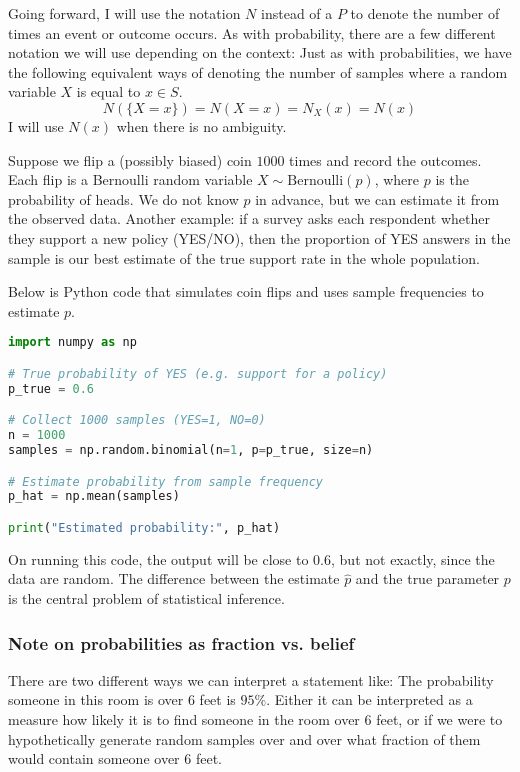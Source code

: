 Going forward, I will use the notation $N$ instead of a $P$ to denote the number of times an event or outcome occurs. As with probability, there are a few different notation we will use depending on the context: Just as with probabilities, we have the following equivalent ways of denoting the number of samples where a random variable $X$ is equal to $x \in S$. 
\begin{equation}
N(\{X= x\}) =N(X=x) = N_X(x) = N(x) 
\end{equation}
I will use $N(x)$ when there is no ambiguity.  



\begin{example}
Suppose we flip a (possibly biased) coin $1000$ times and record the outcomes. 
Each flip is a Bernoulli random variable $X \sim \text{Bernoulli}(p)$, where $p$ is the probability of heads. 
We do not know $p$ in advance, but we can estimate it from the observed data. Another example:  if a survey asks each respondent whether they support a new policy (YES/NO), then the proportion of YES answers in the sample is our best estimate of the true support rate in the whole population. 



Below is Python code that simulates coin flips and uses sample frequencies to estimate $p$.
\begin{lstlisting}[language=Python]
import numpy as np

# True probability of YES (e.g. support for a policy)
p_true = 0.6

# Collect 1000 samples (YES=1, NO=0)
n = 1000
samples = np.random.binomial(n=1, p=p_true, size=n)

# Estimate probability from sample frequency
p_hat = np.mean(samples)

print("Estimated probability:", p_hat)
\end{lstlisting}

On running this code, the output will be close to $0.6$, but not exactly, 
since the data are random. 
The difference between the estimate $\hat{p}$ and the true parameter $p$ 
is the central problem of statistical inference.
\end{example}


\subsubsection*{Note on probabilities as fraction vs. belief}
There are two different ways we can interpret a statement like: The probability someone in this room is over $6$ feet is $95\%$. Either it can be interpreted as a measure how likely it is to find someone in the room over $6$ feet, or if we were to hypothetically generate random samples over and over what fraction of them would contain someone over $6$ feet. 




